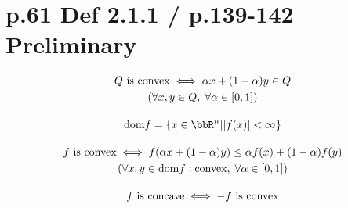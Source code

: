 \documentclass[a4paper, 14pt, dvipdfmx]{extarticle}
\begin{document}
\section*{p.61 Def 2.1.1 / p.139-142 Preliminary}

\begin{gather*}
    \text{$Q$ is convex} \iff \alpha x + (1 - \alpha) y \in Q\\
    ( \forall x, y \in Q, \; \forall \alpha \in [0, 1])\\[1em]
    \mathrm{dom} f = \{ x \in \bbR^n | \abs{f(x)} < \infty \}\\[1em]
    \text{$f$ is convex} \iff f(\alpha x + (1 - \alpha) y) \leq \alpha f(x) + (1 - \alpha) f(y)\\
    ( \forall x, y \in \mathrm{dom} f : \text{convex}, \; \forall \alpha \in [0, 1])\\[1em]
    \text{$f$ is concave} \iff \text{$-f$ is convex}
\end{gather*}
\end{document}
